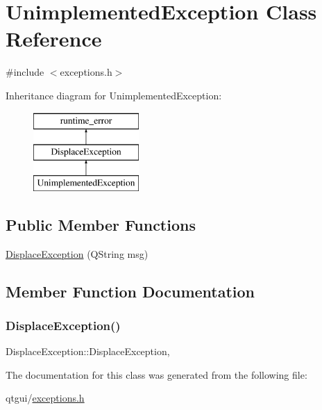 \hypertarget{class_unimplemented_exception}{}\section{Unimplemented\+Exception Class Reference}
\label{class_unimplemented_exception}


{\ttfamily \#include $<$exceptions.\+h$>$}

Inheritance diagram for Unimplemented\+Exception\+:\begin{figure}[H]
\begin{center}
\leavevmode
\includegraphics[height=3.000000cm]{dd/d04/class_unimplemented_exception}
\end{center}
\end{figure}
\subsection*{Public Member Functions}
\begin{DoxyCompactItemize}
\item 
\mbox{\hyperlink{class_unimplemented_exception_a71959ae38eba4226c6251bc704a5a400}{Displace\+Exception}} (Q\+String msg)
\end{DoxyCompactItemize}


\subsection{Member Function Documentation}
\mbox{\label{class_unimplemented_exception_a71959ae38eba4226c6251bc704a5a400}} 
\subsubsection{\texorpdfstring{DisplaceException()}{DisplaceException()}}
{\footnotesize\ttfamily Displace\+Exception\+::\+Displace\+Exception\hspace{0.3cm}{\ttfamily [inline]}, {\ttfamily [explicit]}}



The documentation for this class was generated from the following file\+:\begin{DoxyCompactItemize}
\item 
qtgui/\mbox{\hyperlink{exceptions_8h}{exceptions.\+h}}\end{DoxyCompactItemize}
